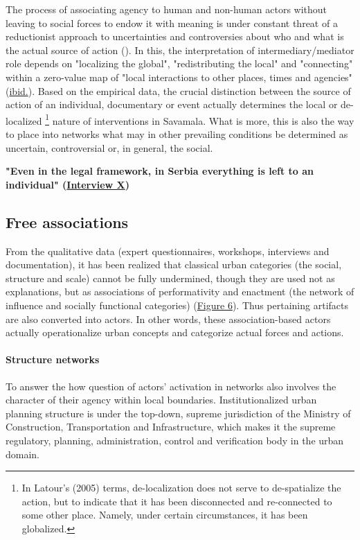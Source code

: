 \documentclass[11pt]{report}
\begin{document}
{{{{The process of associating agency to human and non-human actors without leaving to social forces to endow it with meaning is under constant threat of a reductionist approach to uncertainties and controversies about who and what is the actual source of action (\href{Latour}{\citealt{latour_reassembling_2005}}).
In this, the interpretation of intermediary/mediator role depends on "localizing the global", "redistributing the local" and "connecting" within a zero-value map of "local interactions to other places, times and agencies" (\href{Latour}{ibid.}).
Based on the empirical data, the crucial distinction between the source of action of an individual, documentary or event actually determines the local or de-localized
\footnote{In Latour's (2005) terms, de-localization does not serve to de-spatialize the action, but to indicate that it has been disconnected and re-connected to some other place. Namely, under certain circumstances, it has been globalized.}
nature of interventions in Savamala.
What is more, this is also the way to place into networks what may in other prevailing conditions be determined as uncertain, controversial or, in general, the social.

\textbf{"Even in the legal framework, in Serbia everything is left to an individual" (\href{InterviewX}{Interview X})}

\subsection{Free associations}

From the qualitative data (expert questionnaires, workshops, interviews and documentation), it has been realized that classical urban categories (the social, structure and scale) cannot be fully undermined, though they are used not as explanations, but as associations of performativity and enactment (the network of influence and socially functional categories)  (\href{ref}{Figure 6}).
Thus pertaining artifacts are also converted into actors.
In other words, these association-based actors actually operationalize urban concepts and categorize actual forces and actions.

\paragraph{Structure networks}

To answer the how question of actors' activation in networks also involves the character of their agency within local boundaries.
Institutionalized urban planning structure is under the top-down, supreme jurisdiction of the Ministry of Construction, Transportation and Infrastructure, which makes it the supreme regulatory, planning, administration, control and verification body in the urban domain.
\\

}}}}
\end{document}
